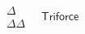 $ \begin{matrix}
 \  & \Delta & \  \\
 \  & \Delta\Delta & \ 
\end{matrix} \mathsf{\text{Triforce}} $